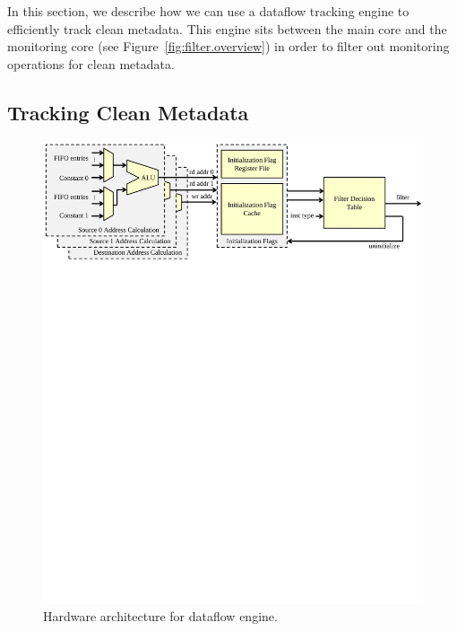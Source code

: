 In this section, we describe how we can use a dataflow tracking engine to
efficiently track clean metadata. This engine sits between the main core and
the monitoring core (see Figure~\ref{fig:filter.overview}) in order to filter
out monitoring operations for clean metadata.

\subsection{Tracking Clean Metadata}

\begin{figure}
  \begin{center}
    \includegraphics[width=\linewidth]{figs/dataflow_architecture.pdf}
    \vspace{-0.3in}
    \caption{Hardware architecture for dataflow engine.}
    \label{fig:filter.architecture} 
    \vspace{-0.1in}
  \end{center}
\end{figure}

